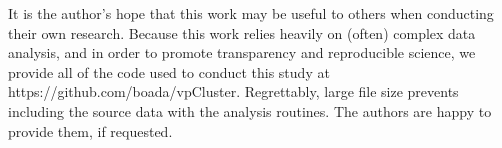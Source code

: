 It is the author's hope that this work may be useful to others when conducting their own research. Because this work relies heavily on (often) complex data analysis, and in order to promote transparency and reproducible science, we provide all of the code used to conduct this study at https://github.com/boada/vpCluster. Regrettably, large file size prevents including the source data with the analysis routines. The authors are happy to provide them, if requested.

